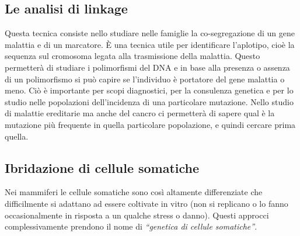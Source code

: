 \documentclass[11pt]{book}
\begin{document}
\subsection{Le analisi di linkage}
Questa tecnica consiste nello studiare nelle famiglie la co-segregazione di un gene malattia e di un marcatore. È una tecnica utile per identificare l’aplotipo, cioè la sequenza sul cromosoma legata alla trasmissione della malattia. Questo permetterà di studiare i polimorfismi del DNA e in base alla presenza o assenza di un polimorfismo si può capire se l’individuo è portatore del gene malattia o meno. Ciò è importante per scopi diagnostici, per la consulenza genetica e per lo studio nelle popolazioni dell’incidenza di una particolare mutazione. Nello studio di malattie ereditarie ma anche del cancro ci permetterà di sapere qual è la mutazione più frequente in quella particolare popolazione, e quindi cercare prima quella.

\subsection{Ibridazione di cellule somatiche} 
Nei mammiferi le cellule somatiche sono così altamente differenziate che difficilmente si adattano ad essere coltivate in vitro (non si replicano o lo fanno occasionalmente in risposta a un qualche stress o danno). Questi approcci complessivamente prendono il nome di \emph{``genetica di cellule somatiche''}.
\end{document}
